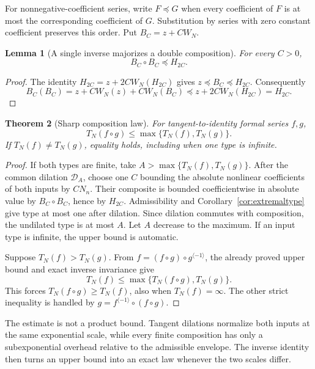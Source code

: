 \documentclass[11pt,a4paper]{article}
\numberwithin{equation}{section}
\newtheorem{theorem}{Theorem}[section]
\newtheorem{lemma}[theorem]{Lemma}
\theoremstyle{definition}
\theoremstyle{remark}
\newcommand{\Type}{T_N}
\newcommand{\inv}[1]{#1^{\langle-1\rangle}}
\begin{document}
For nonnegative-coefficient series, write $F\preceq G$ when every
coefficient of $F$ is at most the corresponding coefficient of $G$.
Substitution by series with zero constant coefficient preserves this
order. Put $B_C=z+CW_N$.

\begin{lemma}[A single inverse majorizes a double composition]
\label{lem:doublemajorant}
For every $C>0$,
\begin{equation}
 B_C\circ B_C\preceq H_{2C}.
 \label{eq:doublemajorant}
\end{equation}
\end{lemma}
\begin{proof}
The identity $H_{2C}=z+2C W_N(H_{2C})$ gives
$z\preceq B_C\preceq H_{2C}$. Consequently
\[
 B_C(B_C)=z+CW_N(z)+CW_N(B_C)
 \preceq z+2CW_N(H_{2C})=H_{2C}.
\]
\end{proof}

\begin{theorem}[Sharp composition law]
\label{thm:composition}
For tangent-to-identity formal series $f,g$,
\begin{equation}
 \boxed{\displaystyle
 \Type(f\circ g)\le\max\{\Type(f),\Type(g)\}.}
 \label{eq:compositionmax}
\end{equation}
If $\Type(f)\ne\Type(g)$, equality holds, including when one type is
infinite.
\end{theorem}
\begin{proof}
If both types are finite, take
$A>\max\{\Type(f),\Type(g)\}$. After the common dilation
$\mathcal D_A$, choose one $C$ bounding the absolute nonlinear
coefficients of both inputs by $CN_n$. Their composite is bounded
coefficientwise in absolute value by $B_C\circ B_C$, hence by $H_{2C}$.
Admissibility and Corollary~\ref{cor:extremaltype} give type at most
one after dilation. Since dilation commutes with composition, the
undilated type is at most $A$. Let $A$ decrease to the maximum. If an
input type is infinite, the upper bound is automatic.

Suppose $\Type(f)>\Type(g)$. From
$f=(f\circ g)\circ\inv g$, the already proved upper bound and exact
inverse invariance give
\[
 \Type(f)\le\max\{\Type(f\circ g),\Type(g)\}.
\]
This forces $\Type(f\circ g)\ge\Type(f)$, also when $\Type(f)=\infty$.
The other strict inequality is handled by
$g=\inv f\circ(f\circ g)$.
\end{proof}

The estimate is not a product bound. Tangent dilations normalize both
inputs at the same exponential scale, while every finite composition
has only a subexponential overhead relative to the admissible envelope.
The inverse identity then turns an upper bound into an exact law whenever
the two scales differ.
\end{document}

